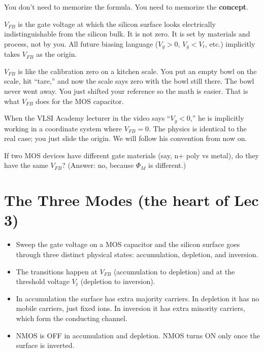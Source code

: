 \documentclass[11pt]{article}
\begin{document}
You don't need to memorize the formula. You need to memorize the \textbf{concept}.

\begin{keyidea}
$V_{FB}$ is the gate voltage at which the silicon surface looks electrically indistinguishable from the silicon bulk. It is not zero. It is set by materials and process, not by you. All future biasing language ($V_g > 0$, $V_g < V_t$, etc.) implicitly takes $V_{FB}$ as the origin.
\end{keyidea}

\begin{hook}
$V_{FB}$ is like the calibration zero on a kitchen scale. You put an empty bowl on the scale, hit ``tare,'' and now the scale says zero with the bowl still there. The bowl never went away. You just shifted your reference so the math is easier. That is what $V_{FB}$ does for the MOS capacitor.
\end{hook}

When the VLSI Academy lecturer in the video says ``$V_g < 0$,'' he is implicitly working in a coordinate system where $V_{FB} = 0$. The physics is identical to the real case; you just slide the origin. We will follow his convention from now on.

\begin{gut}
If two MOS devices have different gate materials (say, n+ poly vs metal), do they have the same $V_{FB}$? (Answer: no, because $\Phi_M$ is different.)
\end{gut}

\section{The Three Modes (the heart of Lec 3)}

\begin{tldr}
\begin{itemize}[leftmargin=*]
\item Sweep the gate voltage on a MOS capacitor and the silicon surface goes through three distinct physical states: accumulation, depletion, and inversion.
\item The transitions happen at $V_{FB}$ (accumulation to depletion) and at the threshold voltage $V_t$ (depletion to inversion).
\item In accumulation the surface has extra majority carriers. In depletion it has no mobile carriers, just fixed ions. In inversion it has extra minority carriers, which form the conducting channel.
\item NMOS is OFF in accumulation and depletion. NMOS turns ON only once the surface is inverted.
\end{itemize}
\end{tldr}
\end{document}

